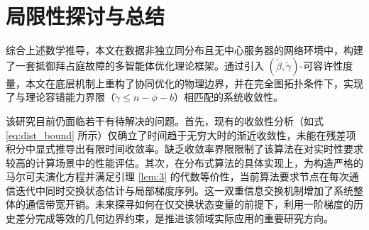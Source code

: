 \chapter{局限性探讨与总结}

综合上述数学推导，本文在数据非独立同分布且无中心服务器的网络环境中，构建了一套抵御拜占庭故障的多智能体优化理论框架。通过引入 $(\tilde{\beta}, \tilde{\gamma})$-可容许性度量，本文在底层机制上重构了协同优化的物理边界，并在完全图拓扑条件下，实现了与理论容错能力界限（$\tilde{\gamma} \le n-\phi-b$）相匹配的系统收敛性。

该研究目前仍面临若干有待解决的问题。首先，现有的收敛性分析（如式 \ref{eq:dist_bound} 所示）仅确立了时间趋于无穷大时的渐近收敛性，未能在残差项积分中显式推导出有限时间收敛率。缺乏收敛率界限限制了该算法在对实时性要求较高的计算场景中的性能评估。其次，在分布式算法的具体实现上，为构造严格的马尔可夫演化方程并满足引理 \ref{lem:3} 的代数等价性，当前算法要求节点在每次通信迭代中同时交换状态估计与局部梯度序列。这一双重信息交换机制增加了系统整体的通信带宽开销。未来探寻如何在仅交换状态变量的前提下，利用一阶梯度的历史差分完成等效的几何边界约束，是推进该领域实际应用的重要研究方向。
